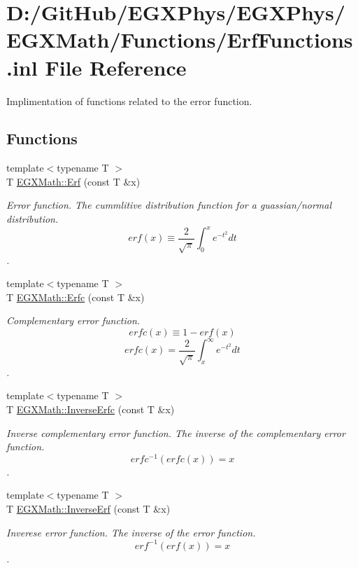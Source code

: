 \hypertarget{_erf_functions_8inl}{}\section{D\+:/\+Git\+Hub/\+E\+G\+X\+Phys/\+E\+G\+X\+Phys/\+E\+G\+X\+Math/\+Functions/\+Erf\+Functions.inl File Reference}
\label{_erf_functions_8inl}


Implimentation of functions related to the error function.  


\subsection*{Functions}
\begin{DoxyCompactItemize}
\item 
{\footnotesize template$<$typename T $>$ }\\T \mbox{\hyperlink{group___e_g_x_math-_functions-_e_r_f_ga167bde890986906e6cd3b32adaa8e6a8}{E\+G\+X\+Math\+::\+Erf}} (const T \&x)
\begin{DoxyCompactList}\small\item\em Error function. The cummlitive distribution function for a guassian/normal distribution. \[ erf(x)\equiv \frac{2}{\sqrt{\pi}}\int_0^x e^{-t^2}dt \]. \end{DoxyCompactList}\item 
{\footnotesize template$<$typename T $>$ }\\T \mbox{\hyperlink{group___e_g_x_math-_functions-_e_r_f_ga58f76263d205c47000068176d3116571}{E\+G\+X\+Math\+::\+Erfc}} (const T \&x)
\begin{DoxyCompactList}\small\item\em Complementary error function. \[ erfc(x)\equiv 1-erf(x) \] \[ erfc(x)=\frac{2}{\sqrt{\pi}}\int_x^\infty e^{-t^2}dt \]. \end{DoxyCompactList}\item 
{\footnotesize template$<$typename T $>$ }\\T \mbox{\hyperlink{group___e_g_x_math-_functions-_e_r_f_gad1f81a581f9f2d66a1a4bad2578c3368}{E\+G\+X\+Math\+::\+Inverse\+Erfc}} (const T \&x)
\begin{DoxyCompactList}\small\item\em Inverse complementary error function. The inverse of the complementary error function. \[erfc^{-1}(erfc(x)) = x\]. \end{DoxyCompactList}\item 
{\footnotesize template$<$typename T $>$ }\\T \mbox{\hyperlink{group___e_g_x_math-_functions-_e_r_f_gab7cacb258ac31ab3929204dc1ed93400}{E\+G\+X\+Math\+::\+Inverse\+Erf}} (const T \&x)
\begin{DoxyCompactList}\small\item\em Inverese error function. The inverse of the error function. \[ erf^{-1}(erf(x)) = x \]. \end{DoxyCompactList}\end{DoxyCompactItemize}


